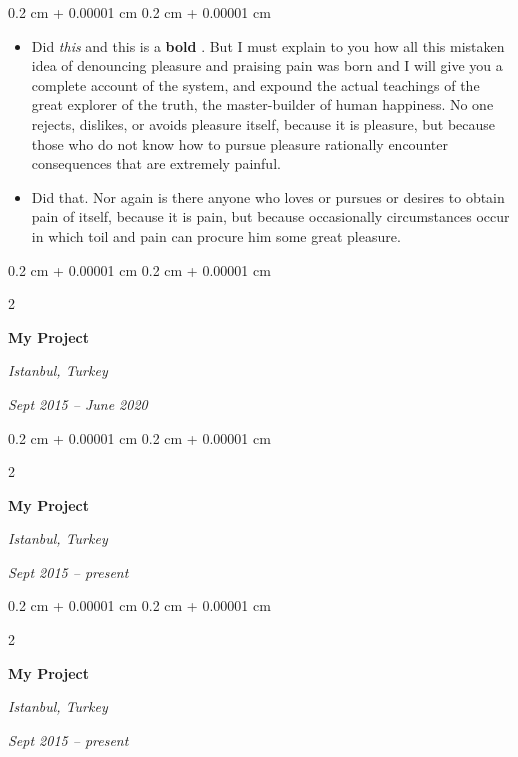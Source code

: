 \documentclass[10pt, letterpaper]{article}
\newenvironment{highlights}{
    \begin{itemize}[
        topsep=0.10 cm,
        parsep=0.10 cm,
        partopsep=0pt,
        itemsep=0pt,
        leftmargin=0.4 cm + 10pt
    ]
}{
    \end{itemize}
} %
\newenvironment{onecolentry}{
    \begin{adjustwidth}{
        0.2 cm + 0.00001 cm
    }{
        0.2 cm + 0.00001 cm
    }
}{
    \end{adjustwidth}
} %
\newenvironment{twocolentry}[2][]{
    \onecolentry
    \def\secondColumn{#2}
    \setcolumnwidth{\fill, 4.5 cm}
    \begin{paracol}{2}
}{
    \switchcolumn \raggedleft \secondColumn
    \end{paracol}
    \endonecolentry
} %
\let\hrefWithoutArrow\href
\renewcommand{\href}[2]{\hrefWithoutArrow{#1}{\ifthenelse{\equal{#2}{}}{ }{#2 }\raisebox{.15ex}{\footnotesize \faExternalLink*}}}
\begin{document}
        \vspace{0.10 cm}
        \begin{onecolentry}
            \begin{highlights}
                \item Did \textit{this} and this is a \textbf{bold} \href{https://example.com}{link}. But I must explain to you how all this mistaken idea of denouncing pleasure and praising pain was born and I will give you a complete account of the system, and expound the actual teachings of the great explorer of the truth, the master-builder of human happiness. No one rejects, dislikes, or avoids pleasure itself, because it is pleasure, but because those who do not know how to pursue pleasure rationally encounter consequences that are extremely painful.
                \item Did that. Nor again is there anyone who loves or pursues or desires to obtain pain of itself, because it is pain, but because occasionally circumstances occur in which toil and pain can procure him some great pleasure.
            \end{highlights}
        \end{onecolentry}


        \vspace{0.2 cm}

        \begin{twocolentry}{
        \textit{Istanbul, Turkey}    
            
        \textit{Sept 2015 – June 2020}}
            \textbf{My Project}
        \end{twocolentry}



        \vspace{0.2 cm}

        \begin{twocolentry}{
        \textit{Istanbul, Turkey}    
            
        \textit{Sept 2015 – present}}
            \textbf{My Project}
        \end{twocolentry}



        \vspace{0.2 cm}

        \begin{twocolentry}{
        \textit{Istanbul, Turkey}    
            
        \textit{Sept 2015 – present}}
            \textbf{My Project}
        \end{twocolentry}
\end{document}
